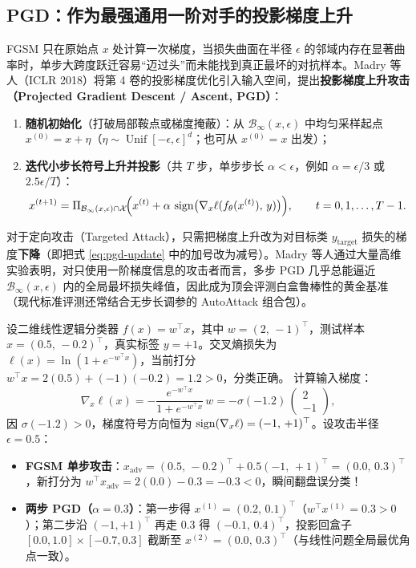 \subsection{PGD：作为最强通用一阶对手的投影梯度上升}

FGSM 只在原始点 $x$ 处计算一次梯度，当损失曲面在半径 $\epsilon$ 的邻域内存在显著曲率时，单步大跨度跃迁容易“迈过头”而未能找到真正最坏的对抗样本。Madry 等人（ICLR 2018）将第 4 卷的投影梯度优化引入输入空间，提出\textbf{投影梯度上升攻击（Projected Gradient Descent / Ascent, PGD）}：
\begin{enumerate}
  \item \textbf{随机初始化}（打破局部鞍点或梯度掩蔽）：从 $\mathcal{B}_\infty(x, \epsilon)$ 中均匀采样起点 $x^{(0)} = x + \eta$（$\eta \sim \operatorname{Unif}[-\epsilon, \epsilon]^d$；也可从 $x^{(0)}=x$ 出发）；
  \item \textbf{迭代小步长符号上升并投影}（共 $T$ 步，单步步长 $\alpha < \epsilon$，例如 $\alpha = \epsilon / 3$ 或 $2.5\epsilon / T$）：
  \begin{equation}\label{eq:pgd-update}
    x^{(t+1)} = \Pi_{\mathcal{B}_\infty(x,\epsilon) \cap \mathcal{X}}\!\Big(x^{(t)} + \alpha\,\operatorname{sign}\!\big(\nabla_x \ell(f_\theta(x^{(t)}),\, y)\big)\Big),
    \qquad t = 0,1,\dots,T-1.
  \end{equation}
\end{enumerate}
对于定向攻击（Targeted Attack），只需把梯度上升改为对目标类 $y_{\text{target}}$ 损失的梯度\textbf{下降}（即把式 \eqref{eq:pgd-update} 中的加号改为减号）。Madry 等人通过大量高维实验表明，对只使用一阶梯度信息的攻击者而言，多步 PGD 几乎总能逼近 $\mathcal{B}_\infty(x,\epsilon)$ 内的全局最坏损失峰值，因此成为顶会评测白盒鲁棒性的黄金基准（现代标准评测还常结合无步长调参的 AutoAttack 组合包）。

\begin{example}\label{ex:pgd-2d}
设二维线性逻辑分类器 $f(x) = w^\top x$，其中 $w = (2,\, -1)^\top$，测试样本 $x = (0.5,\, -0.2)^\top$，真实标签 $y = +1$。交叉熵损失为 $\ell(x) = \ln(1 + e^{-w^\top x})$，当前打分 $w^\top x = 2(0.5) + (-1)(-0.2) = 1.2 > 0$，分类正确。
计算输入梯度：
\[
  \nabla_x \ell(x) = -\frac{e^{-w^\top x}}{1 + e^{-w^\top x}}\, w = -\sigma(-1.2)\, \begin{pmatrix} 2 \\ -1 \end{pmatrix},
\]
因 $\sigma(-1.2) > 0$，梯度符号方向恒为 $\operatorname{sign}(\nabla_x \ell) = (-1,\, +1)^\top$。设攻击半径 $\epsilon = 0.5$：
\begin{itemize}
  \item \textbf{FGSM 单步攻击}：$x_{\mathrm{adv}} = (0.5,\, -0.2)^\top + 0.5(-1,\, +1)^\top = (0.0,\, 0.3)^\top$，新打分为 $w^\top x_{\mathrm{adv}} = 2(0.0) - 0.3 = -0.3 < 0$，瞬间翻盘误分类！
  \item \textbf{两步 PGD（$\alpha = 0.3$）}：第一步得 $x^{(1)} = (0.2,\, 0.1)^\top$（$w^\top x^{(1)} = 0.3 > 0$）；第二步沿 $(-1, +1)^\top$ 再走 $0.3$ 得 $(-0.1,\, 0.4)^\top$，投影回盒子 $[0.0, 1.0]\times[-0.7, 0.3]$ 截断至 $x^{(2)} = (0.0,\, 0.3)^\top$（与线性问题全局最优角点一致）。
\end{itemize}
\end{example}

